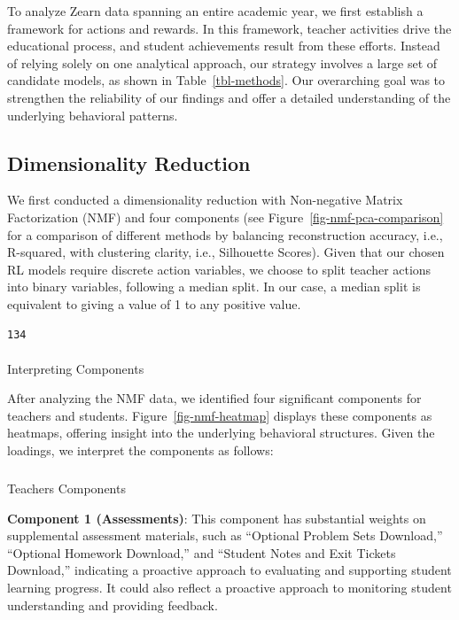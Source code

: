 \documentclass[
  number,
  preprint,
  3p,
  onecolumn]{elsarticle}
\makeatletter
\let\oldparagraph\paragraph
\renewcommand{\paragraph}{
    \@ifstar
      \xxxParagraphStar
      \xxxParagraphNoStar
  }
\newcommand{\xxxParagraphStar}[1]{\oldparagraph*{#1}\mbox{}}
\newcommand{\xxxParagraphNoStar}[1]{\oldparagraph{#1}\mbox{}}
\let\oldsubparagraph\subparagraph
\renewcommand{\subparagraph}{
    \@ifstar
      \xxxSubParagraphStar
      \xxxSubParagraphNoStar
  }
\newcommand{\xxxSubParagraphStar}[1]{\oldsubparagraph*{#1}\mbox{}}
\newcommand{\xxxSubParagraphNoStar}[1]{\oldsubparagraph{#1}\mbox{}}
\makeatother
\begin{document}
To analyze Zearn data spanning an entire academic year, we first
establish a framework for actions and rewards. In this framework,
teacher activities drive the educational process, and student
achievements result from these efforts. Instead of relying solely on one
analytical approach, our strategy involves a large set of candidate
models, as shown in Table~\ref{tbl-methods}. Our overarching goal was to
strengthen the reliability of our findings and offer a detailed
understanding of the underlying behavioral patterns.

\subsection{Dimensionality Reduction}\label{dimensionality-reduction}

We first conducted a dimensionality reduction with Non-negative Matrix
Factorization (NMF) and four components (see
Figure~\ref{fig-nmf-pca-comparison} for a comparison of different
methods by balancing reconstruction accuracy, i.e., R-squared, with
clustering clarity, i.e., Silhouette Scores). Given that our chosen RL
models require discrete action variables, we choose to split teacher
actions into binary variables, following a median split. In our case, a
median split is equivalent to giving a value of 1 to any positive value.

\begin{verbatim}
134
\end{verbatim}

\paragraph{Interpreting Components}\label{interpreting-components}

After analyzing the NMF data, we identified four significant components
for teachers and students. Figure~\ref{fig-nmf-heatmap} displays these
components as heatmaps, offering insight into the underlying behavioral
structures. Given the loadings, we interpret the components as follows:

\subparagraph{Teachers Components}\label{teachers-components}

\textbf{Component 1 (Assessments)}: This component has substantial
weights on supplemental assessment materials, such as ``Optional Problem
Sets Download,'' ``Optional Homework Download,'' and ``Student Notes and
Exit Tickets Download,'' indicating a proactive approach to evaluating
and supporting student learning progress. It could also reflect a
proactive approach to monitoring student understanding and providing
feedback.
\end{document}
